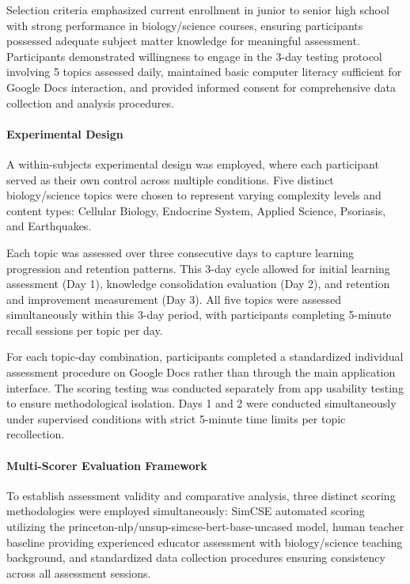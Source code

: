 {Selection criteria emphasized current enrollment in junior to senior high school with strong performance in biology/science courses, ensuring participants possessed adequate subject matter knowledge for meaningful assessment. Participants demonstrated willingness to engage in the 3-day testing protocol involving 5 topics assessed daily, maintained basic computer literacy sufficient for Google Docs interaction, and provided informed consent for comprehensive data collection and analysis procedures.

\paragraph{Experimental Design}

A within-subjects experimental design was employed, where each participant served as their own control across multiple conditions. Five distinct biology/science topics were chosen to represent varying complexity levels and content types: Cellular Biology, Endocrine System, Applied Science, Psoriasis, and Earthquakes.

Each topic was assessed over three consecutive days to capture learning progression and retention patterns. This 3-day cycle allowed for initial learning assessment (Day 1), knowledge consolidation evaluation (Day 2), and retention and improvement measurement (Day 3). All five topics were assessed simultaneously within this 3-day period, with participants completing 5-minute recall sessions per topic per day.

For each topic-day combination, participants completed a standardized individual assessment procedure on Google Docs rather than through the main application interface. The scoring testing was conducted separately from app usability testing to ensure methodological isolation. Days 1 and 2 were conducted simultaneously under supervised conditions with strict 5-minute time limits per topic recollection.

\paragraph{Multi-Scorer Evaluation Framework}

To establish assessment validity and comparative analysis, three distinct scoring methodologies were employed simultaneously: SimCSE automated scoring utilizing the princeton-nlp/unsup-simcse-bert-base-uncased model, human teacher baseline providing experienced educator assessment with biology/science teaching background, and standardized data collection procedures ensuring consistency across all assessment sessions.

}
